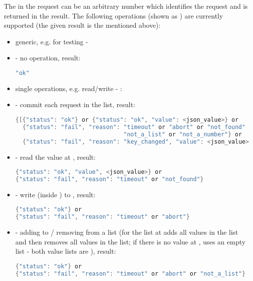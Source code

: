 The  in the request can be an arbitrary number which identifies the
request and is returned in the result.
The following operations (shown as ) are currently
supported (the given result is the  mentioned above):
\begin{itemize}
  \item[] \hspace{-1.7em}generic, e.g. for testing - 
  \item {} - no operation, result:
\begin{lstlisting}[language=java]
"ok"
\end{lstlisting}
  \item[] \hspace{-1.7em}single operations, e.g. read/write - :
  \item {} - commit each request in the list, result:
\begin{lstlisting}[language=java]
{[{"status": "ok"} or {"status": "ok", "value": <json_value>} or
  {"status": "fail", "reason": "timeout" or "abort" or "not_found" or
                               "not_a_list" or "not_a_number"} or
  {"status": "fail", "reason": "key_changed", "value": <json_value>}]}
\end{lstlisting}
  \item {} - read the value at , result:
\begin{lstlisting}[language=java]
{"status": "ok", "value", <json_value>} or
{"status": "fail", "reason": "timeout" or "not_found"}
\end{lstlisting}
  \item {} - write  (inside ) to , result:
\begin{lstlisting}[language=java]
{"status": "ok"} or
{"status": "fail", "reason": "timeout" or "abort"}
\end{lstlisting}
  \item {} - adding to / removing from a list
  (for the list at  adds all values in the  list and
  then removes all values in the  list; if there is no value at
  , uses an empty list - both value lists are \code{[<value>]}), result:
\begin{lstlisting}[language=java]
{"status": "ok"} or
{"status": "fail", "reason": "timeout" or "abort" or "not_a_list"}

\end{lstlisting}
\end{itemize}
